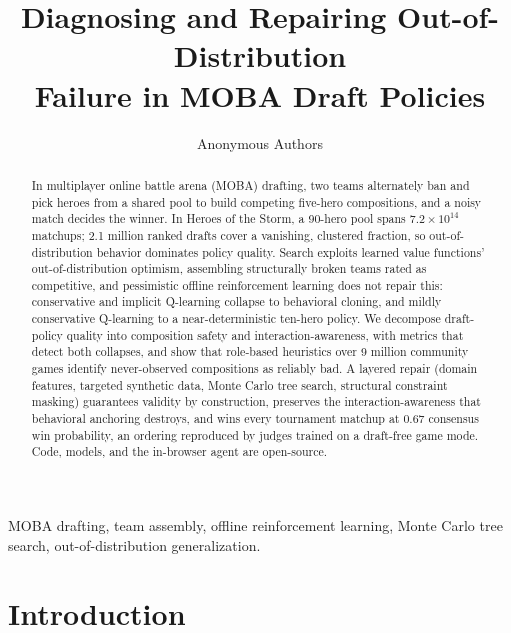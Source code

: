 \documentclass[journal]{IEEEtran}
\begin{document}
\title{Diagnosing and Repairing Out-of-Distribution\\ Failure in MOBA Draft Policies}

\author{Anonymous Authors}

\maketitle

\begin{abstract}
In multiplayer online battle arena (MOBA) drafting, two teams alternately ban and pick heroes from a shared pool to build competing five-hero compositions, and a noisy match decides the winner. In Heroes of the Storm, a 90-hero pool spans $7.2 \times 10^{14}$ matchups; 2.1 million ranked drafts cover a vanishing, clustered fraction, so out-of-distribution behavior dominates policy quality. Search exploits learned value functions' out-of-distribution optimism, assembling structurally broken teams rated as competitive, and pessimistic offline reinforcement learning does not repair this: conservative and implicit Q-learning collapse to behavioral cloning, and mildly conservative Q-learning to a near-deterministic ten-hero policy. We decompose draft-policy quality into composition safety and interaction-awareness, with metrics that detect both collapses, and show that role-based heuristics over 9 million community games identify never-observed compositions as reliably bad. A layered repair (domain features, targeted synthetic data, Monte Carlo tree search, structural constraint masking) guarantees validity by construction, preserves the interaction-awareness that behavioral anchoring destroys, and wins every tournament matchup at 0.67 consensus win probability, an ordering reproduced by judges trained on a draft-free game mode. Code, models, and the in-browser agent are open-source.
\end{abstract}

\begin{IEEEkeywords}
MOBA drafting, team assembly, offline reinforcement learning, Monte Carlo tree search, out-of-distribution generalization.
\end{IEEEkeywords}

\section{Introduction}
\end{document}
